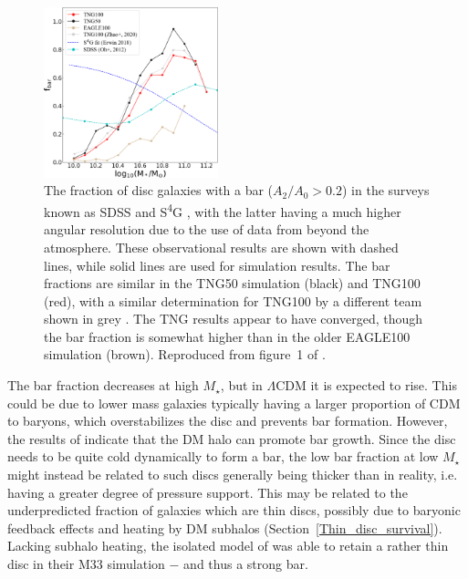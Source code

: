 \documentclass[fleqn,usenatbib,useAMS]{mnras} %
\begin{document}
\begin{figure}
	\centering
	\includegraphics[width=0.45\textwidth]{Roshan_2021_bar_speed_Figure_1}
	\caption{The fraction of disc galaxies with a bar ($A_2/A_0 > 0.2$) in the surveys known as SDSS \citep[cyan;][]{Oh_2012} and S\textsuperscript{4}G \citep[blue;][]{Erwin_2018}, with the latter having a much higher angular resolution due to the use of data from beyond the atmosphere. These observational results are shown with dashed lines, while solid lines are used for simulation results. The bar fractions are similar in the TNG50 simulation (black) and TNG100 (red), with a similar determination for TNG100 by a different team shown in grey \citep{Zhao_2020}. The TNG results appear to have converged, though the bar fraction is somewhat higher than in the older EAGLE100 simulation (brown). Reproduced from figure~1 of \citet{Roshan_2021_bar_speed}.}
	\label{Roshan_2021_bar_fraction}
\end{figure}

The bar fraction decreases at high $M_{\star}$, but in $\Lambda$CDM it is expected to rise. This could be due to lower mass galaxies typically having a larger proportion of CDM to baryons, which overstabilizes the disc and prevents bar formation. However, the results of \citet{Sellwood_2019} indicate that the DM halo can promote bar growth. Since the disc needs to be quite cold dynamically to form a bar, the low bar fraction at low $M_{\star}$ might instead be related to such discs generally being thicker than in reality, i.e. having a greater degree of pressure support. This may be related to the underpredicted fraction of galaxies which are thin discs, possibly due to baryonic feedback effects and heating by DM subhalos (Section~\ref{Thin_disc_survival}). Lacking subhalo heating, the isolated model of \citet{Sellwood_2019} was able to retain a rather thin disc in their M33 simulation $-$ and thus a strong bar.
\end{document}
